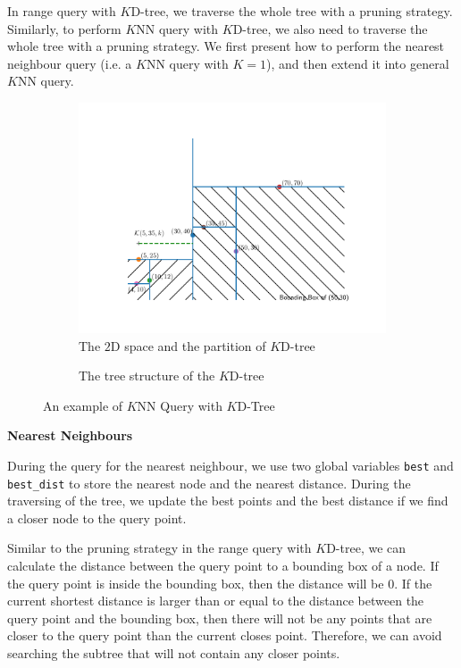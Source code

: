 In range query with $K$D-tree, we traverse the whole tree with a pruning strategy. Similarly, to perform $K$NN query with $K$D-tree, we also need to traverse the whole tree with a pruning strategy. We first present how to perform the nearest neighbour query (i.e. a $K$NN query with $K=1$), and then extend it into general $K$NN query.

\begin{figure}[!htb]
     \centering
     \begin{subfigure}[b]{0.58\textwidth}
         \centering
         \includegraphics[width=\textwidth]{graphs/implementation/queries/knn_query_kdtree}
         \caption{The $2$D space and the partition of $K$D-tree}
     \end{subfigure}
     \hfill
     \begin{subfigure}[b]{0.40\textwidth}
         \centering
         
         \caption{The tree structure of the $K$D-tree}
     \end{subfigure}
        \caption{An example of $K$NN Query with $K$D-Tree}
        \label{fig:kdtree-knnquery}
\end{figure}

\noindent
\textbf{Nearest Neighbours}

During the query for the nearest neighbour, we use two global variables \texttt{best} and \texttt{best\_dist} to store the nearest node and the nearest distance. During the traversing of the tree, we update the best points and the best distance if we find a closer node to the query point.

Similar to the pruning strategy in the range query with $K$D-tree, we can calculate the distance between the query point to a bounding box of a node. If the query point is inside the bounding box, then the distance will be $0$. If the current shortest distance is larger than or equal to the distance between the query point and the bounding box, then there will not be any points that are closer to the query point than the current closes point. Therefore, we can avoid searching the subtree that will not contain any closer points.

